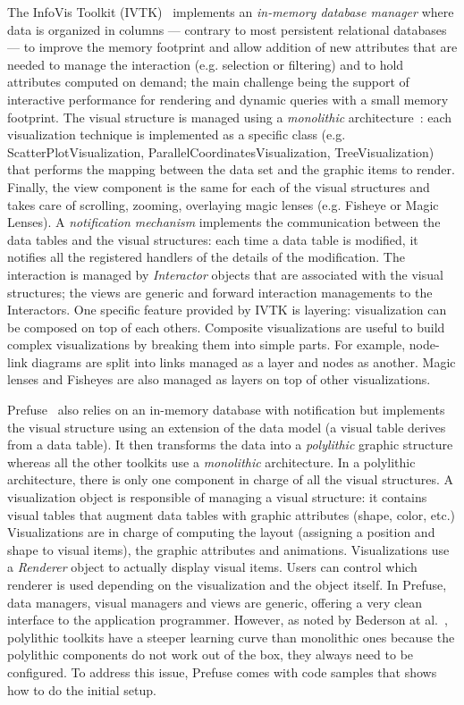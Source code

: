The InfoVis Toolkit (IVTK)~\cite{InfoVis} implements an
\emph{in-memory database manager} where data is organized in columns
--- contrary to most persistent relational databases --- to improve
the memory footprint and allow addition of new attributes that are
needed to manage the interaction (e.g. selection or filtering) and to
hold attributes computed on demand; the main challenge being the
support of interactive performance for rendering and dynamic queries
with a small memory footprint.  The visual structure is managed using
a \emph{monolithic} architecture~\cite{Polylithic}: each visualization
technique is implemented as a specific class
(e.g. ScatterPlotVisualization, ParallelCoordinatesVisualization,
TreeVisualization) that performs the mapping between the data set and
the graphic items to render.  Finally, the view component is the same
for each of the visual structures and takes care of scrolling,
zooming, overlaying magic lenses (e.g. Fisheye or Magic Lenses).  A
\emph{notification mechanism} implements the communication between the
data tables and the visual structures: each time a data table is
modified, it notifies all the registered handlers of the details of
the modification. The interaction is managed by \emph{Interactor}
objects that are associated with the visual structures; the views are
generic and forward interaction managements to the Interactors.  One
specific feature provided by IVTK is layering: visualization can be
composed on top of each others.  Composite visualizations are useful
to build complex visualizations by breaking them into simple parts. For
example, node-link diagrams are split into links managed as a layer
and nodes as another.  Magic lenses and Fisheyes are also managed as
layers on top of other visualizations.

Prefuse~\cite{Prefuse} also relies on an in-memory database with
notification but implements the visual structure using an extension of
the data model (a visual table derives from a data table).  It then
transforms the data into a \emph{polylithic} graphic structure whereas
all the other toolkits use a \emph{monolithic} architecture.  In a
polylithic architecture, there is only one component in charge of all
the visual structures.  A visualization object is responsible of
managing a visual structure: it contains visual tables that augment
data tables with graphic attributes (shape, color, etc.)
Visualizations are in charge of computing the layout (assigning a
position and shape to visual items), the graphic attributes and
animations.  Visualizations use a \emph{Renderer} object to actually
display visual items.  Users can control which renderer is used
depending on the visualization and the object itself.  In Prefuse,
data managers, visual managers and views are generic, offering a very
clean interface to the application programmer.  However, as noted by
Bederson at al.~\cite{Polylithic}, polylithic toolkits have a steeper
learning curve than monolithic ones because the polylithic components
do not work out of the box, they always need to be configured.  To
address this issue, Prefuse comes with code samples that shows how to
do the initial setup.


